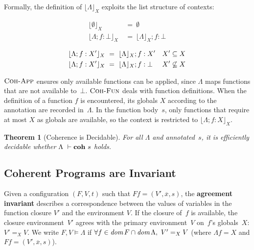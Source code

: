 \documentclass[openright,a4paper,11pt]{scrartcl}
\newcommand{\slist}[1]{\ensuremath{\overline{#1}}}
\newcommand{\dom}{\ensuremath{\textup{\textit{dom\,}}}}
\newcommand{\incl}{\ensuremath{\subseteq}}
\newcommand{\nrule}[1]{\ensuremath{\textup{\textsc{#1}}}}
\newcommand{\LT}{\ensuremath{\Lambda}}
\newcommand{\lv}{\ensuremath{X}}
\newcommand{\coh}[3]{\ensuremath{#1~\vdash\textbf{\textup{coh}}~{}#3}}
\newcommand{\restrict}[2]{\ensuremath{\lfloor#1\rfloor_{#2}}}
\newcommand{\agr}[3]{\ensuremath{#1,#2\models#3}}
\theoremstyle{plain}
\newtheorem{theorem}{Theorem}
\theoremstyle{plain}
\theoremstyle{plain}
\theoremstyle{plain}
\theoremstyle{nonumberplain}
\begin{document}
Formally, the definition of \restrict{\LT}{X} exploits the list structure of contexts:
\begin{center}
\begin{minipage}{.4\textwidth}
\begin{align*}
 \restrict{\emptyset}{\lv}~&=~\emptyset\\
 \restrict{\LT;f:\bot}{\lv}~&=~\restrict{\LT}{\lv};f:\bot
\end{align*}
\end{minipage}
\begin{minipage}{.55\textwidth}
\begin{align*}
 \restrict{\LT;f:\lv'}{\lv}~&=~\restrict{\LT}{\lv};f:\lv' &&\lv'\incl\lv\\
 \restrict{\LT;f:\lv'}{\lv}~&=~\restrict{\LT}{\lv};f:\bot &&\lv'\not\incl\lv
\end{align*}
\end{minipage}
\end{center}
\nrule{Coh-App} ensures only available functions can be applied, since $\LT$ maps functions that are not available to~$\bot$.
\nrule{Coh-Fun} deals with function definitions.
When the definition of a function $f$ is encountered, its globals $X$  according to the annotation are recorded in~$\LT$.
In the function body~$s$, only functions that require at most $X$ as globals are available, so the
context is restricted to $\restrict{\LT;f:\lv}{\lv}$.




\begin{theorem}[Coherence is Decidable]
  For all $\LT$ and annotated~$s$, it is efficiently decidable whether $\coh{\LT}{a}{s}$ holds.
\label{thm:coh_dec}
\end{theorem}












\subsection{Coherent Programs are Invariant}
Given a configuration $(F, V,t)$ such that $F f = (V', \slist{x}, s)$, the \textbf{agreement invariant} describes a correspondence between the values of variables in the function closure $V'$ and the environment $V$.
If the closure of~$f$ is available, the closure environment~$V'$ agrees with the primary environment~$V$ on~$f$'s globals~$X$: {${V' =_{\lv} V}$}.
We write $\agr{F}{V}{\LT}$ if $\forall f\in\dom{F}\cap\dom{\LT},~ V' =_{\lv} V$ (where $\LT f = \lv$ and  $F f = (V',\slist{x}, s)$).
\end{document}

